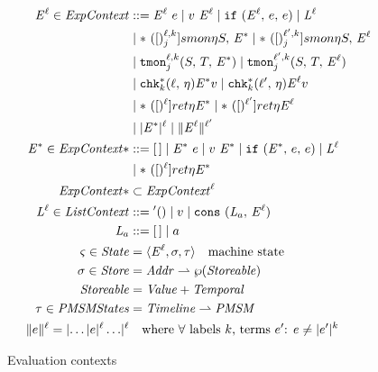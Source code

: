 \documentclass[preprint,onecolumn,9pt]{sigplanconf} %
\begin{document}
\begin{figure}
\begin{align*}
\mathit{E}^{\ell} \in \mathit{ExpContext} &::=
      \mathit{E}^{\ell}\ e
 \mid v\ \mathit{E}^{\ell}
 \mid {\tt if}{\ }({\mathit{E}^{\ell},\,e,\,e})
 \mid \mathit{L}^{\ell} \\
&\mid {\tt *}{\ }({[})^{\ell,k}_{j}]{smon}{\eta}{S,\, \mathit{E}^{*}}
 \mid {\tt *}{\ }({[})^{\ell^\prime,k}_{j}]{smon}{\eta}{S,\, \mathit{E}^{\ell}} \\
&\mid {\tt tmon}{^{\ell,k}_{j}}({S,\,T,\,\mathit{E}^{*}})
 \mid {\tt tmon}{^{\ell^\prime,k}_{j}}({S,\,T,\,\mathit{E}^{\ell}}) \\
&\mid {\tt chk}{^{*}_{k}}({\ell,\, \eta}){\mathit{E}^{*}}{v}
 \mid {\tt chk}{^{*}_{k}}({\ell^\prime,\, \eta}){\mathit{E}^{\ell}}{v} \\
&\mid {\tt *}{\ }({[})^{\ell}]{ret}{\eta}{\mathit{E}^{*}}
 \mid {\tt *}{\ }({[})^{\ell^\prime}]{ret}{\eta}{\mathit{E}^{\ell}} \\
&\mid \lvert\mathit{E}^{*}\rvert^{\ell}
 \mid \lVert\mathit{E}^{\ell}\rVert^{\ell^\prime}
\\
\mathit{E}^{*} \in \mathit{ExpContext}* &::=
      [\,]
 \mid \mathit{E}^{*}\ e
 \mid v\ \mathit{E}^{*}
 \mid {\tt if}{\ }({\mathit{E}^{*},\,e,\,e})
 \mid \mathit{L}^{\ell} \\
&\mid {\tt *}{\ }({[})^{\ell}]{ret}{\eta}{\mathit{E}^{*}} \\
\mathit{ExpContext}* &\subset \mathit{ExpContext}^\ell
\\
\mathit{L}^{\ell} \in \mathit{ListContext} &::=
      {\tt '()}
 \mid v
 \mid {\tt \tt cons}{\ }({\mathit{L}_a,\, \mathit{E}^{\ell}})
 \\
\mathit{L}_a &::=
 [\,] \mid a
\\
\varsigma \in \mathit{State} &= \langle\mathit{E}^{\ell}, \sigma, \tau\rangle \quad\text{machine state}
\\
\sigma \in \mathit{Store} &= \mathit{Addr} \mathrel{\rightharpoonup} \wp(\mathit{Storeable}) \\
\mathit{Storeable} &= \mathit{Value} + \mathit{Temporal}
\\
\tau \in \mathit{PMSMStates} &= \mathit{Timeline} \mathrel{\rightharpoonup} \mathit{PMSM}
\\
\lVert e\rVert^{\ell} = \lvert \ldots \lvert e\rvert^{\ell} \ldots \rvert^{\ell}
&\quad\text{where $\forall$ labels $k$, terms $e^\prime$: $e \neq \lvert e^\prime\rvert^{k}$}
\end{align*}
\caption{Evaluation contexts}
\label{fig:ctx}
\end{figure}
\end{document}
